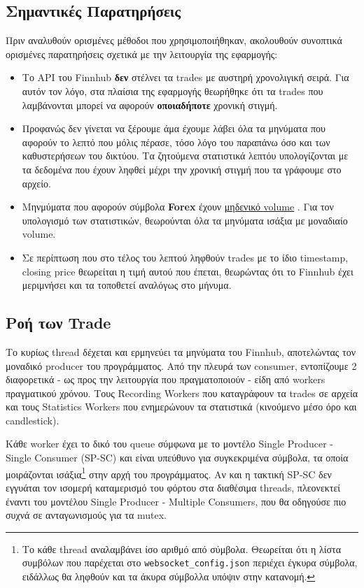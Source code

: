 \documentclass[12pt]{article}
\begin{document}
\subsection{Σημαντικές Παρατηρήσεις}
\label{subsec:notes}
Πριν αναλυθούν ορισμένες μέθοδοι που χρησιμοποιήθηκαν, ακολουθούν συνοπτικά ορισμένες παρατηρήσεις σχετικά με την λειτουργία της εφαρμογής:
\begin{itemize}
    \item Το API του Finnhub \textbf{δεν} στέλνει τα trades με αυστηρή χρονολιγική σειρά. Για αυτόν τον λόγο, στα πλαίσια της εφαρμογής θεωρήθηκε ότι τα trades που λαμβάνονται μπορεί να αφορούν \textbf{οποιαδήποτε} χρονική στιγμή.
    \item Προφανώς δεν γίνεται να ξέρουμε άμα έχουμε λάβει όλα τα μηνύματα που αφορούν το λεπτό που μόλις πέρασε, τόσο λόγο του παραπάνω όσο και των καθυστερήσεων του δικτύου. Τα ζητούμενα στατιστικά λεπτόυ υπολογίζονται με τα δεδομένα που έχουν ληφθεί μέχρι την χρονική στιγμή που τα γράφουμε στο αρχείο.
    \item Μηνμύματα που αφορούν σύμβολα \textbf{Forex} έχουν \href{https://github.com/finnhubio/Finnhub-API/issues/213}{μηδενικό volume} . Για τον υπολογισμό των στατιστικών, θεωρούνται όλα τα μηνύματα ισάξια με μοναδιαίο volume.
    \item Σε περίπτωση που στο τέλος του λεπτού ληφθούν trades με το ίδιο timestamp, closing price θεωρείται η τιμή αυτού που έπεται, θεωρώντας ότι το Finnhub έχει μεριμνήσει και τα τοποθετεί αναλόγως στο μήνυμα.
\end{itemize}

\subsection{Ροή των Trade}

Το κυρίως thread δέχεται και ερμηνεύει τα μηνύματα του Finnhub, αποτελώντας τον μοναδικό producer του προγράμματος. Από την πλευρά των consumer, εντοπίζουμε 2 διαφορετικά - ως προς την λειτουργία που πραγματοποιούν - είδη από workers πραγματικού χρόνου. Τους Recording Workers που καταγράφουν τα trades σε αρχεία και τους Statistics Workers που ενημερώνουν τα στατιστικά (κινούμενο μέσο όρο και candlestick).

Κάθε worker έχει το δικό του queue σύμφωνα με το μοντέλο Single Producer - Single Consumer (SP-SC) και είναι υπεύθυνο για συγκεκριμένα σύμβολα, τα οποία μοιράζονται ισάξια\footnote{Το κάθε thread αναλαμβάνει ίσο αριθμό από σύμβολα. Θεωρείται ότι η λίστα συμβόλων που παρέχεται στο \texttt{websocket\_config.json} περιέχει έγκυρα σύμβολα, ειδάλλως θα ληφθούν και τα άκυρα σύμβολλα υπόψιν στην κατανομή.} στην αρχή του προγράμματος. Αν και η τακτική SP-SC δεν εγγυάται τον ισομερή καταμερισμό του φόρτου στα διαθέσιμα threads, πλεονεκτεί έναντι του μοντέλου Single Producer - Multiple Consumers, που θα οδηγούσε πιο συχνά σε ανταγωνισμούς για τα mutex.
\end{document}
